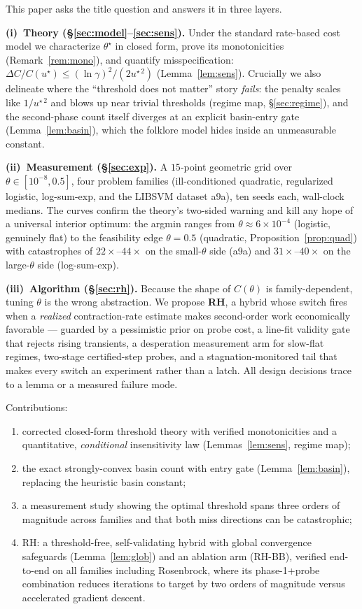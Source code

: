 ﻿\documentclass[10pt]{article}
\begin{document}
This paper asks the title question and answers it in three layers.

\textbf{(i)~Theory (\S\ref{sec:model}--\ref{sec:sens}).}
Under the standard rate-based cost model we characterize
$\theta^\star$ in closed form, prove its monotonicities
(Remark~\ref{rem:mono}), and quantify misspecification:
$\Delta C/C(u^\star)\le(\ln\gamma)^2/(2u^{\star\,2})$
(Lemma~\ref{lem:sens}). Crucially we also delineate where the
``threshold does not matter'' story \emph{fails}: the penalty scales
like $1/u^{\star\,2}$ and blows up near trivial thresholds
(regime map, \S\ref{sec:regime}), and the second-phase count itself
diverges at an explicit basin-entry gate (Lemma~\ref{lem:basin}),
which the folklore model hides inside an unmeasurable constant.

\textbf{(ii)~Measurement (\S\ref{sec:exp}).}
A $15$-point geometric grid over $\theta\in[10^{-8},0.5]$, four problem
families (ill-conditioned quadratic, regularized logistic, log-sum-exp,
and the LIBSVM dataset a9a), ten seeds each, wall-clock medians. The
curves confirm the theory's two-sided warning and kill any hope of a
universal interior optimum: the argmin ranges from
$\theta\approx6\times10^{-4}$ (logistic, genuinely flat) to the
feasibility edge $\theta=0.5$ (quadratic, Proposition~\ref{prop:quad})
with catastrophes of $22\times$--$44\times$ on the small-$\theta$ side
(a9a) and $31\times$--$40\times$ on the large-$\theta$ side
(log-sum-exp).

\textbf{(iii)~Algorithm (\S\ref{sec:rh}).}
Because the shape of $C(\theta)$ is family-dependent, tuning $\theta$
is the wrong abstraction. We propose \textbf{RH}, a hybrid whose switch
fires when a \emph{realized} contraction-rate estimate makes
second-order work economically favorable --- guarded by a pessimistic
prior on probe cost, a line-fit validity gate that rejects rising
transients, a desperation measurement arm for slow-flat regimes,
two-stage certified-step probes, and a stagnation-monitored tail that
makes every switch an experiment rather than a latch. All design
decisions trace to a lemma or a measured failure mode.

Contributions:
\begin{enumerate}\itemsep2pt
\item corrected closed-form threshold theory with verified
      monotonicities and a quantitative, \emph{conditional} insensitivity
      law (Lemmas~\ref{lem:sens}, regime map);
\item the exact strongly-convex basin count with entry gate
      (Lemma~\ref{lem:basin}), replacing the heuristic basin constant;
\item a measurement study showing the optimal threshold spans three
      orders of magnitude across families and that both miss directions
      can be catastrophic;
\item RH: a threshold-free, self-validating hybrid with global
      convergence safeguards (Lemma~\ref{lem:glob}) and an ablation
      arm (RH-BB), verified end-to-end on all families including
      Rosenbrock, where its phase-1+probe combination reduces
      iterations to target by two orders of magnitude versus accelerated
      gradient descent.
\end{enumerate}
\end{document}
